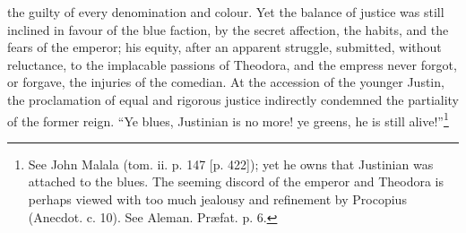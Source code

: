 the guilty of every denomination and colour. Yet the balance of justice was still inclined in favour of the blue faction, by the secret affection, the habits, and the fears of the emperor; his equity, after an apparent struggle, submitted, without reluctance, to the implacable passions of Theodora, and the empress never forgot, or forgave, the injuries of the comedian. At the accession of the younger Justin, the proclamation of equal and rigorous justice indirectly condemned the partiality of the former reign. \texthebrew{“}Ye blues, Justinian is no more! ye greens, he is still alive!\texthebrew{}”\footnote{See John Malala (tom. ii. p. 147 [p. 422]); yet he owns that Justinian was attached to the blues. The seeming discord of the emperor and Theodora is perhaps viewed with too much jealousy and refinement by Procopius (Anecdot. c. 10). See Aleman. Præfat. p. 6.}


